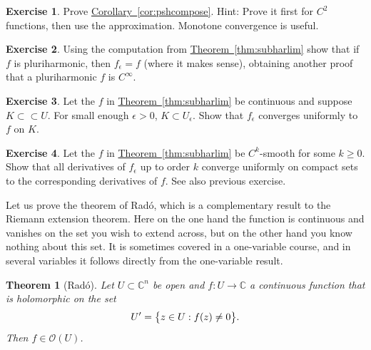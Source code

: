 \documentclass[12pt,openany]{book}
\newcommand{\avoidbreak}{\postdisplaypenalty=100}
\newcommand{\C}{{\mathbb{C}}}
\newcommand{\sO}{{\mathscr{O}}}
\theoremstyle{plain}
\newtheorem{thm}{Theorem}[section]
\theoremstyle{remark}
\theoremstyle{definition}
\newenvironment{exbox}{%
    \def\FrameCommand{\vrule width 1pt \relax\hspace{10pt}}%
    \MakeFramed{\advance\hsize-\width\FrameRestore}%
}{%
    \endMakeFramed
}
\theoremstyle{exercise}
\newtheorem{exercise}{Exercise}[section]
\theoremstyle{example}
\newcommand{\thmref}[1]{\hyperref[#1]{Theorem~\ref*{#1}}}
\newcommand{\corref}[1]{\hyperref[#1]{Corollary~\ref*{#1}}}
\begin{document}
\begin{exbox}
\begin{exercise}
Prove \corref{cor:pshcompose}.
Hint: Prove it first for $C^2$ functions,
then use the approximation.
Monotone convergence is useful.
\end{exercise}

\begin{exercise}
Using the computation from
\thmref{thm:subharlim} show that if $f$ is pluriharmonic, then
$f_\epsilon = f$ (where it makes sense), obtaining another proof that
a pluriharmonic $f$ is $C^\infty$.
\end{exercise}

\begin{exercise}
Let the $f$ in \thmref{thm:subharlim} be continuous and suppose $K \subset
\subset U$.  For small enough $\epsilon >0$, $K \subset U_\epsilon$.
Show that $f_\epsilon$ converges uniformly to $f$ on $K$.
\end{exercise}

\begin{exercise}
Let the $f$ in \thmref{thm:subharlim} be $C^k$-smooth for some $k \geq 0$.
Show that all derivatives of $f_\epsilon$ up to order $k$ converge uniformly
on compact sets to the corresponding derivatives of $f$.  See also previous
exercise.
\end{exercise}
\end{exbox}

Let us prove the theorem of
Rad\'o, which is a complementary result to the Riemann extension theorem.
Here on the one hand the function is
continuous and vanishes on the set you wish to extend across, but on the
other hand you know nothing about this set.
It is sometimes covered in a one-variable course,
and in several variables it follows directly from
the one-variable result.

\begin{thm}[Rad\'o] \label{thm:rado}
Let $U \subset \C^n$ be open and $f \colon U \to \C$ a continuous
function that is holomorphic on the set
\begin{equation*}
U' = \bigl\{ z \in U : f(z) \not= 0 \bigr\} .
\avoidbreak
\end{equation*}
Then $f \in \sO(U)$.
\end{thm}
\end{document}
